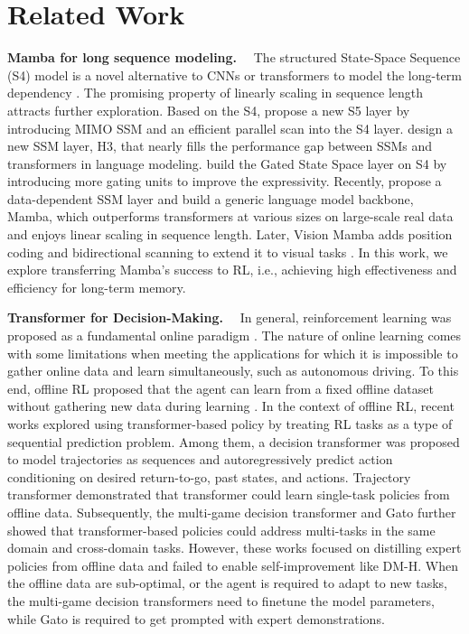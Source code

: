 \section{Related Work}

\noindent\textbf{Mamba for long sequence modeling.}~~
The structured State-Space Sequence (S4) model is a novel alternative to CNNs or transformers to model the long-term dependency \cite{12}. The promising property of linearly scaling in sequence length attracts further exploration. Based on the S4, \citet{16} propose a new S5 layer by introducing MIMO SSM and an efficient parallel scan into the S4 layer. \citet{17} design a new SSM layer, H3, that nearly fills the performance gap between SSMs and transformers in language modeling. \citet{18} build the Gated State Space layer on S4 by introducing more gating units to improve the expressivity.
Recently, \citet{10} propose a data-dependent SSM layer and build a generic language model backbone, Mamba, which outperforms transformers at various sizes on large-scale real data and enjoys linear scaling in sequence length. Later, Vision Mamba adds position coding and bidirectional scanning to extend it to visual tasks \cite{11}. 
In this work, we explore transferring Mamba's success to RL, i.e., achieving high effectiveness and efficiency for long-term memory.

\noindent\textbf{Transformer for Decision-Making.}~~
In general, reinforcement learning was proposed as a fundamental online paradigm \cite{38}. The nature of online learning comes with some limitations when meeting the applications for which it is impossible to gather online data and learn simultaneously, such as autonomous driving. To this end, offline RL proposed that the agent can learn from a fixed offline dataset without gathering new data during learning \cite{39,40,41,42}. In the context of offline RL, recent works explored using transformer-based policy by treating RL tasks as a type of sequential prediction problem. Among them, a decision transformer \cite{2} was proposed to model trajectories as sequences and autoregressively predict action conditioning on desired return-to-go, past states, and actions. Trajectory transformer \cite{43} demonstrated that transformer could learn single-task policies from offline data. Subsequently, the multi-game decision transformer \cite{14} and Gato \cite{27} further showed that transformer-based policies could address multi-tasks in the same domain and cross-domain tasks. However, these works focused on distilling expert policies from offline data and failed to enable self-improvement like DM-H. When the offline data are sub-optimal, or the agent is required to adapt to new tasks, the multi-game decision transformers need to finetune the model parameters, while Gato is required to get prompted with expert demonstrations.

